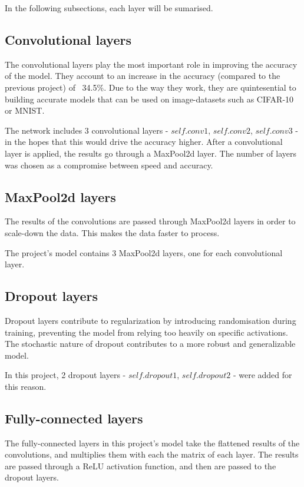 \documentclass[conference]{IEEEtran}
\begin{document}
In the following subsections, each layer will be sumarised.

\subsection{Convolutional layers}
The convolutional layers play the most important role in improving the accuracy of the model. They account to an increase
in the accuracy (compared to the previous project) of ~34.5\%. Due to the way they work, they are quintesential to building
accurate models that can be used on image-datasets such as CIFAR-10 or MNIST.

The network includes 3 convolutional layers - $self.conv1$, $self.conv2$, $self.conv3$ - in the hopes that this would drive
the accuracy higher. After a convolutional layer is applied, the results go through a MaxPool2d layer. The number of layers
was chosen as a compromise between speed and accuracy.

\subsection{MaxPool2d layers}
The results of the convolutions are passed through MaxPool2d layers in order to scale-down the data. This makes the data
faster to process.

The project's model contains 3 MaxPool2d layers, one for each convolutional layer.

\subsection{Dropout layers}
Dropout layers contribute to regularization by introducing randomisation during training, preventing the model from relying
too heavily on specific activations. The stochastic nature of dropout contributes to a more robust and generalizable model.

In this project, 2 dropout layers - $self.dropout1$, $self.dropout2$ - were added for this reason.

\subsection{Fully-connected layers}
The fully-connected layers in this project's model take the flattened results of the convolutions, and multiplies them with
each the matrix of each layer. The results are passed through a ReLU activation function, and then are passed to the dropout
layers.
\end{document}
